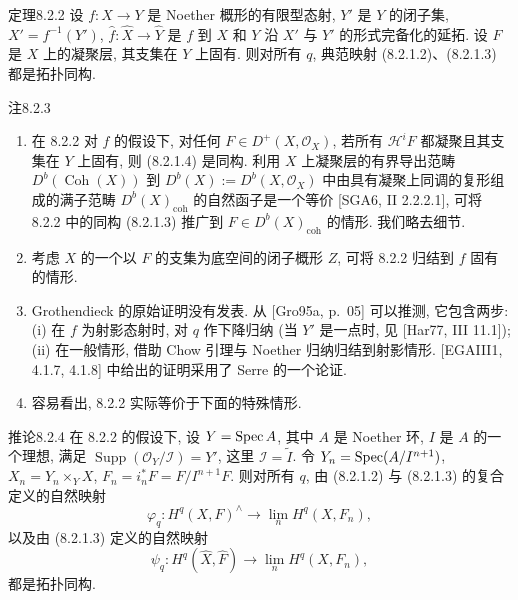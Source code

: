 \begin{origstatement}{定理}{8.2.2}\label{ch08:th822}
设 $f:X\to Y$ 是 Noether 概形的有限型态射, $Y'$ 是 $Y$ 的闭子集, $X'=f^{-1}(Y')$, $\widehat f:\widehat X\to\widehat Y$ 是 $f$ 到 $X$ 和 $Y$ 沿 $X'$ 与 $Y'$ 的形式完备化的延拓. 设 $F$ 是 $X$ 上的凝聚层, 其支集在 $Y$ 上固有. 则对所有 $q$, 典范映射 (8.2.1.2)、(8.2.1.3) 都是拓扑同构.
\end{origstatement}

\begin{origstatement}{注}{8.2.3}\label{ch08:rem823}
\begin{enumerate}
\item[(a)] 在 8.2.2 对 $f$ 的假设下, 对任何 $F\in D^+(X,\mathcal O_X)$, 若所有 $\mathcal H^iF$ 都凝聚且其支集在 $Y$ 上固有, 则 (8.2.1.4) 是同构.
利用 $X$ 上凝聚层的有界导出范畴 $D^b(\operatorname{Coh}(X))$ 到 $D^b(X):=D^b(X,\mathcal O_X)$ 中由具有凝聚上同调的复形组成的满子范畴 $D^b(X)_{\mathrm{coh}}$ 的自然函子是一个等价 [SGA6, II 2.2.2.1], 可将 8.2.2 中的同构 (8.2.1.3) 推广到 $F\in D^b(X)_{\mathrm{coh}}$ 的情形. 我们略去细节.
\item[(b)] 考虑 $X$ 的一个以 $F$ 的支集为底空间的闭子概形 $Z$, 可将 8.2.2 归结到 $f$ 固有的情形.
\item[(c)] Grothendieck 的原始证明没有发表. 从 [Gro95a, p.~05] 可以推测, 它包含两步: (i) 在 $f$ 为射影态射时, 对 $q$ 作下降归纳 (当 $Y'$ 是一点时, 见 [Har77, III 11.1]); (ii) 在一般情形, 借助 Chow 引理与 Noether 归纳归结到射影情形. [EGAIII1, 4.1.7, 4.1.8] 中给出的证明采用了 Serre 的一个论证.
\item[(d)] 容易看出, 8.2.2 实际等价于下面的特殊情形.
\end{enumerate}
\end{origstatement}

\begin{origstatement}{推论}{8.2.4}\label{ch08:cor824}
在 8.2.2 的假设下, 设 $Y=\operatorname{Spec} A$, 其中 $A$ 是 Noether 环, $I$ 是 $A$ 的一个理想, 满足 $\operatorname{Supp}(\mathcal O_Y/\mathcal I)=Y'$, 这里 $\mathcal I=\widetilde I$. 令 $Y_n=\operatorname{Spec}(A/I^{n+1})$, $X_n=Y_n\times_YX$, $F_n=i_n^*F=F/I^{n+1}F$. 则对所有 $q$, 由 (8.2.1.2) 与 (8.2.1.3) 的复合定义的自然映射
\begin{equation}\varphi_q:H^q(X,F)^\wedge\longrightarrow\lim_nH^q(X,F_n),\tag{8.2.4.1}\label{ch08:eq8241}\end{equation}
以及由 (8.2.1.3) 定义的自然映射
\begin{equation}\psi_q:H^q(\widehat X,\widehat F)\longrightarrow\lim_nH^q(X,F_n),\tag{8.2.4.2}\label{ch08:eq8242}\end{equation}
都是拓扑同构.
\end{origstatement}

